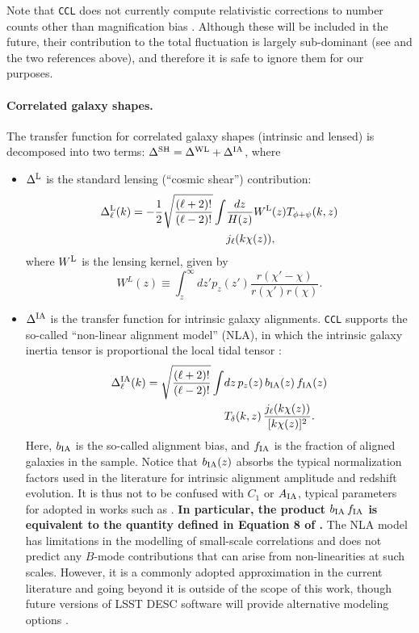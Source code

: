 \documentclass[\docopts]{\docclass}
\newcommand{\ccl}{{\tt CCL}\xspace}
\begin{document}
Note that \ccl does not currently compute relativistic corrections to number counts other than magnification bias \citep{2011PhRvD..84d3516C,2011PhRvD..84f3505B}. Although these will be included in the future, their contribution to the total fluctuation is largely sub-dominant (see \citealt{GReffects} and the two references above), and therefore it is safe to ignore them for our purposes.

\paragraph{\bf Correlated galaxy shapes.} The transfer function for correlated galaxy shapes (intrinsic and lensed) is decomposed into two terms: $\Delta^{\rm SH}=\Delta^{\rm WL}+\Delta^{\rm IA}$, where
\begin{itemize}
  \item $\Delta^{\rm L}$ is the standard lensing (``cosmic shear'') contribution:
    \begin{align} \label{eq:transfer_lensing}
      \nonumber
      \Delta_\ell^{\rm L}(k)=-\frac{1}{2}\sqrt{\frac{(\ell+2)!}{(\ell-2)!}}\int &\frac{dz}{H(z)} W^{\rm L}(z)T_{\phi+\psi}(k,z)\\
      &j_\ell(k\chi(z)),
    \end{align}
    where $W^{\rm L}$ is the lensing kernel, given by
    \begin{equation}\label{eq:window_shear}
      W^L(z)\equiv\int_z^\infty dz' p_z(z')\frac{r(\chi'-\chi)}{r(\chi')r(\chi)}.
    \end{equation}
  \item $\Delta^{\rm IA}$ is the transfer function for intrinsic galaxy alignments. \ccl supports the so-called ``non-linear alignment model'' (NLA), in which the intrinsic galaxy inertia tensor is proportional the local tidal tensor \citep{Catelan01,2004PhRvD..70f3526H,2007MNRAS.381.1197H}:
    \begin{align}\nonumber
      \Delta_\ell^{\rm IA}(k)=\sqrt{\frac{(\ell+2)!}{(\ell-2)!}}\int &dz\,p_z(z)\,b_{\rm IA}(z)\,f_{\rm IA}(z)\\
      &T_\delta(k,z)\,\frac{j_\ell(k\chi(z))}{[k\chi(z)]^2}.
      \label{eq:transfer_ia}
    \end{align}
    Here, $b_{\rm IA}$ is the so-called alignment bias, and $f_{\rm IA}$ is the fraction of aligned galaxies in the sample. Notice that $b_{\rm IA}(z)$ absorbs the typical normalization factors used in the literature for intrinsic alignment amplitude and redshift evolution. It is thus not to be confused with $C_1$ or $A_{\rm IA}$, typical parameters for adopted in works such as \citet{vanUitert18,Joudaki18,Hildebrandt17}. {\bf In particular, the product $b_{\rm IA}\,f_{\rm IA}$ is equivalent to the quantity defined in Equation 8 of \cite{Hildebrandt17}.} The NLA model has limitations in the modelling of small-scale correlations \citep{Singh15} and does not predict any $B$-mode contributions that can arise from non-linearities at such scales. However, it is a commonly adopted approximation in the current literature and going beyond it is outside of the scope of this work, though future versions of LSST DESC software will provide alternative modeling options \citep{Blazek17}.
    

\end{itemize}
\end{document}
